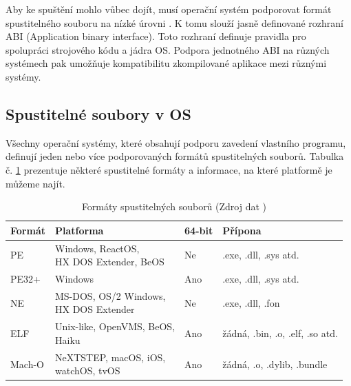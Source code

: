 Aby ke spuštění mohlo vůbec dojít, musí operační systém podporovat formát spustitelného souboru na nízké úrovni  \cite{wiki:Executable}. K tomu slouží jasně definované rozhraní ABI (Application binary interface). Toto rozhraní definuje pravidla pro spolupráci strojového kódu a jádra OS. Podpora jednotného ABI na různých systémech pak umožňuje kompatibilitu zkompilované aplikace mezi různými systémy.



\subsection{Spustitelné soubory v OS}



Všechny operační systémy, které obsahují podporu zavedení vlastního programu, definují jeden nebo více podporovaných formátů spustitelných souborů. Tabulka č. \ref{table:executableFileformat} prezentuje některé spustitelné formáty a informace, na které platformě je můžeme najít.


\noindent
\begin{table}[H]
    \caption{Formáty spustitelných souborů (Zdroj dat \cite{wiki:Comparison_of_executable_file_formats})}
    \label{table:executableFileformat}
    
    \centering
    \begin{tabular}{|l|l|l|l|}
        \hline
        Formát & Platforma                               & 64-bit & Přípona     \\
        \hline
    	\hline
        PE     & \makecell[l]{Windows, ReactOS,\\ HX DOS Extender, BeOS} & Ne     &  .exe, .dll, .sys atd.  \\ \hline
        PE32+  & Windows & Ano    &  .exe, .dll, .sys atd.  \\ \hline
        NE     & \makecell[l]{MS-DOS, OS/2 Windows,\\ HX DOS Extender}   & Ne     &  .exe, .dll, .fon       \\ \hline
        ELF    & \makecell[l]{Unix-like, OpenVMS, BeOS,\\ Haiku}         & Ano    &  žádná, .bin, .o, .elf, .so atd.   \\ \hline
        Mach-O & \makecell[l]{NeXTSTEP, macOS, iOS,\\ watchOS, tvOS}     & Ano    &  žádná, .o, .dylib, .bundle  \\ \hline
    \end{tabular}
\end{table}

